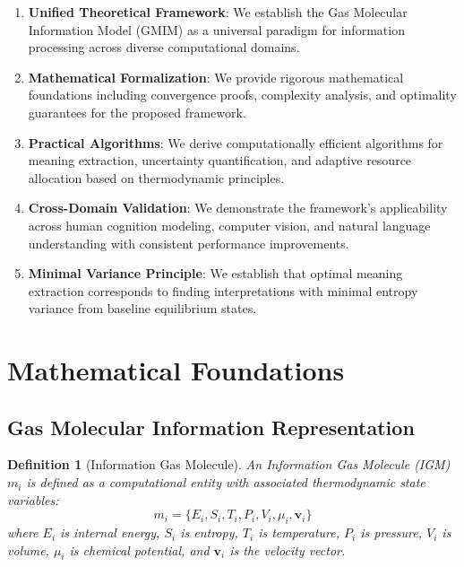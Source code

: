\documentclass[11pt,a4paper]{article}
\newtheorem{definition}[theorem]{Definition}
\begin{document}
\begin{enumerate}
\item \textbf{Unified Theoretical Framework}: We establish the Gas Molecular Information Model (GMIM) as a universal paradigm for information processing across diverse computational domains.

\item \textbf{Mathematical Formalization}: We provide rigorous mathematical foundations including convergence proofs, complexity analysis, and optimality guarantees for the proposed framework.

\item \textbf{Practical Algorithms}: We derive computationally efficient algorithms for meaning extraction, uncertainty quantification, and adaptive resource allocation based on thermodynamic principles.

\item \textbf{Cross-Domain Validation}: We demonstrate the framework's applicability across human cognition modeling, computer vision, and natural language understanding with consistent performance improvements.

\item \textbf{Minimal Variance Principle}: We establish that optimal meaning extraction corresponds to finding interpretations with minimal entropy variance from baseline equilibrium states.
\end{enumerate}

\section{Mathematical Foundations}

\subsection{Gas Molecular Information Representation}

\begin{definition}[Information Gas Molecule]
An Information Gas Molecule (IGM) $m_i$ is defined as a computational entity with associated thermodynamic state variables:
\begin{equation}
m_i = \{E_i, S_i, T_i, P_i, V_i, \mu_i, \mathbf{v}_i\}
\end{equation}
where $E_i$ is internal energy, $S_i$ is entropy, $T_i$ is temperature, $P_i$ is pressure, $V_i$ is volume, $\mu_i$ is chemical potential, and $\mathbf{v}_i$ is the velocity vector.
\end{definition}
\end{document}
